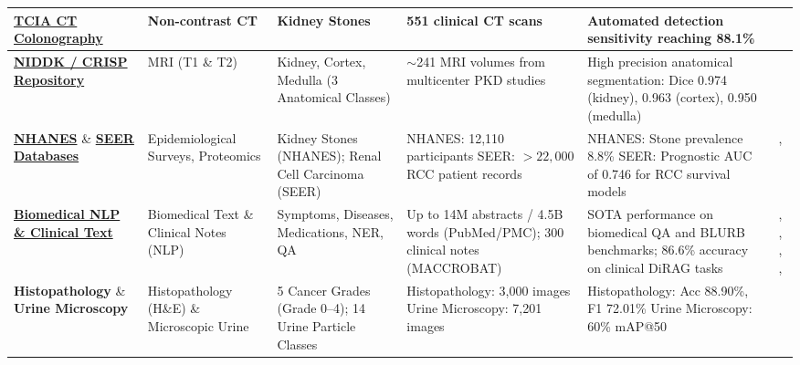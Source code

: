 \begin{longtable}{|L{2.8cm}|L{1.8cm}|L{2.5cm}|L{3.0cm}|L{3.6cm}|L{2.2cm}|}
\hline
\textbf{\href{https://www.cancerimagingarchive.net/collection/ct-colonography/}{TCIA CT Colonography}} & Non-contrast CT & Kidney Stones & 551 clinical CT scans & Automated detection sensitivity reaching 88.1\% & \cite{elton2022deep} \\
\hline
\textbf{\href{https://www.niddkrepository.org/studies/crisp/}{NIDDK / CRISP Repository}} & MRI (T1 \& T2) & Kidney, Cortex, Medulla (3 Anatomical Classes) & $\sim$241 MRI volumes from multicenter PKD studies & High precision anatomical segmentation: Dice 0.974 (kidney), 0.963 (cortex), 0.950 (medulla) & \cite{raj2022deep} \\
\hline
\textbf{\href{https://www.cdc.gov/nchs/nhanes/index.htm}{NHANES}} \& \textbf{\href{https://seer.cancer.gov/}{SEER Databases}} & Epidemiological Surveys, Proteomics & Kidney Stones (NHANES); Renal Cell Carcinoma (SEER) & NHANES: 12,110 participants \newline SEER: $>22,000$ RCC patient records & NHANES: Stone prevalence 8.8\% \newline SEER: Prognostic AUC of 0.746 for RCC survival models & \cite{scales2012prevalence}, \cite{wang2022survival} \\
\hline
\textbf{\href{https://huggingface.co/datasets/ncbi/pubmed}{Biomedical NLP \& Clinical Text}} & Biomedical Text \& Clinical Notes (NLP) & Symptoms, Diseases, Medications, NER, QA & Up to 14M abstracts / 4.5B words (PubMed/PMC); 300 clinical notes (MACCROBAT) & SOTA performance on biomedical QA and BLURB benchmarks; 86.6\% accuracy on clinical DiRAG tasks & \cite{lee2020biobert}, \cite{fang2023bioformer}, \cite{luo2022biogpt}, \cite{gu2021domain}, \cite{sreenivas2025enhancing} \\
\hline
\textbf{Histopathology} \& \textbf{Urine Microscopy} & Histopathology (H\&E) \& Microscopic Urine & 5 Cancer Grades (Grade 0–4); 14 Urine Particle Classes & Histopathology: 3,000 images \newline Urine Microscopy: 7,201 images & Histopathology: Acc 88.90\%, F1 72.01\% \newline Urine Microscopy: 60\% mAP@50 & \cite{akhtar2026yolov11} \\
\hline



\end{longtable}
